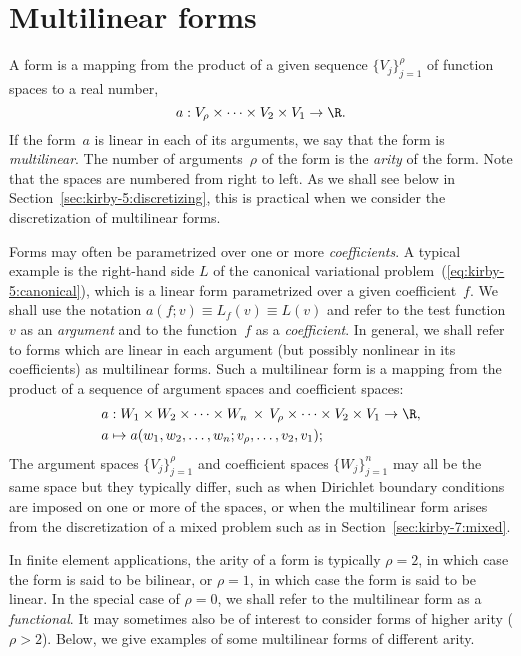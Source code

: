 \section{Multilinear forms}

A form is a mapping from the product of a given sequence
$\{V_j\}_{j=1}^{\rho}$ of function spaces to a real number,
\begin{equation}
  a : V_{\rho} \times \cdots \times V_2 \times V_1 \rightarrow \R.
\end{equation}
If the form~$a$ is linear in each of its arguments, we say that the
form is \emph{multilinear}. The number of arguments~$\rho$ of the form
is the \emph{arity} of the form. Note that the spaces are numbered
from right to left. As we shall see below in
Section~\ref{sec:kirby-5:discretizing}, this is practical when we
consider the discretization of multilinear forms.

Forms may often be parametrized over one or more
\emph{coefficients}. A typical example is the right-hand side $L$ of
the canonical variational problem~(\ref{eq:kirby-5:canonical}), which
is a linear form parametrized over a given coefficient~$f$. We shall
use the notation $a(f; v) \equiv L_f(v) \equiv L(v)$ and refer to the
test function~$v$ as an \emph{argument} and to the function~$f$ as a
\emph{coefficient}. In general, we shall refer to forms which are
linear in each argument (but possibly nonlinear in its coefficients)
as multilinear forms. Such a multilinear form is a mapping from the
product of a sequence of argument spaces and coefficient spaces:
\begin{equation}
  \begin{split}
    a &: W_1 \times W_2 \times \cdots \times W_n \, \times \,
         V_{\rho} \times \cdots \times V_2 \times V_1 \rightarrow \R, \\
    a &\mapsto a(w_1, w_2, \ldots, w_n; v_{\rho}, \ldots, v_2, v_1);
  \end{split}
\end{equation}
The argument spaces $\{V_j\}_{j=1}^{\rho}$ and coefficient spaces
$\{W_j\}_{j=1}^n$ may all be the same space but they typically differ,
such as when Dirichlet boundary conditions are imposed on one or more of
the spaces, or when the multilinear form arises from the discretization
of a mixed problem such as in Section~\ref{sec:kirby-7:mixed}.

In finite element applications, the arity of a form is typically $\rho
= 2$, in which case the form is said to be bilinear, or $\rho = 1$, in
which case the form is said to be linear. In the special case of $\rho
= 0$, we shall refer to the multilinear form as a
\emph{functional}. It may sometimes also be of interest to consider
forms of higher arity ($\rho > 2$). Below, we give examples of some
multilinear forms of different arity.

